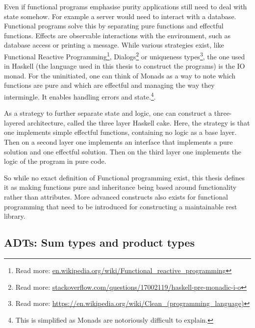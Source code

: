 \begin{description}
Even if functional programs emphasise purity applications still need to deal
        with state somehow. For example a server would need to interact with a
        database. Functional programs solve this by separating pure functions
        and effectful functions. Effects are observable interactions with the
        environment, such as database access or printing a message.  While
        various strategies exist, like Functional Reactive
        Programming\footnote{Read more:
        \url{en.wikipedia.org/wiki/Functional_reactive_programming}},
        Dialogs\footnote{Read more:
        \url{stackoverflow.com/questions/17002119/haskell-pre-monadic-i-o}} or
        uniqueness types\footnote{Read more:
        \url{https://en.wikipedia.org/wiki/Clean_(programming_language)}}, the
        one used in Haskell (the language used in this thesis to construct the
        programs) is the IO monad. For the uninitiated, one can think of Monads
        as a way to note which functions are pure and which are effectful and
        managing the way they intermingle. It enables handling errors
        and state.\footnote{This is simplified as Monads are notoriously
        difficult to explain.}. 

As a strategy to further separate state and logic, one can construct a
        three-layered architecture, called the three layer Haskell cake. Here,
        the strategy is that one implements simple effectful functions,
        containing no logic as a base layer. Then on a second layer one
        implements an interface that implements a pure solution and one
        effectful solution. Then on the third layer one implements the logic of
        the program in pure code.  
\end{description}

So while no exact definition of Functional programming exist, this thesis
defines it as making functions pure and inheritance being based around
functionality rather than attributes. More advanced constructs also exists for
functional programming that need to be introduced for constructing a
maintainable rest library. 

\subsection{ADTs: Sum types and product types}\label{types}


